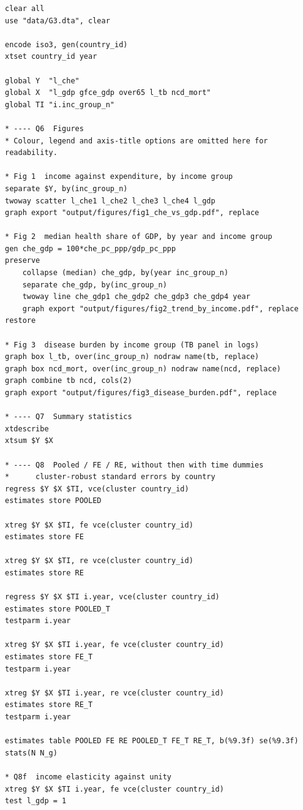 \documentclass[11pt,a4paper]{article}
\begin{document}
\begin{footnotesize}
\begin{verbatim}
clear all
use "data/G3.dta", clear

encode iso3, gen(country_id)
xtset country_id year

global Y  "l_che"
global X  "l_gdp gfce_gdp over65 l_tb ncd_mort"
global TI "i.inc_group_n"

* ---- Q6  Figures
* Colour, legend and axis-title options are omitted here for readability.

* Fig 1  income against expenditure, by income group
separate $Y, by(inc_group_n)
twoway scatter l_che1 l_che2 l_che3 l_che4 l_gdp
graph export "output/figures/fig1_che_vs_gdp.pdf", replace

* Fig 2  median health share of GDP, by year and income group
gen che_gdp = 100*che_pc_ppp/gdp_pc_ppp
preserve
    collapse (median) che_gdp, by(year inc_group_n)
    separate che_gdp, by(inc_group_n)
    twoway line che_gdp1 che_gdp2 che_gdp3 che_gdp4 year
    graph export "output/figures/fig2_trend_by_income.pdf", replace
restore

* Fig 3  disease burden by income group (TB panel in logs)
graph box l_tb, over(inc_group_n) nodraw name(tb, replace)
graph box ncd_mort, over(inc_group_n) nodraw name(ncd, replace)
graph combine tb ncd, cols(2)
graph export "output/figures/fig3_disease_burden.pdf", replace

* ---- Q7  Summary statistics
xtdescribe
xtsum $Y $X

* ---- Q8  Pooled / FE / RE, without then with time dummies
*      cluster-robust standard errors by country
regress $Y $X $TI, vce(cluster country_id)
estimates store POOLED

xtreg $Y $X $TI, fe vce(cluster country_id)
estimates store FE

xtreg $Y $X $TI, re vce(cluster country_id)
estimates store RE

regress $Y $X $TI i.year, vce(cluster country_id)
estimates store POOLED_T
testparm i.year

xtreg $Y $X $TI i.year, fe vce(cluster country_id)
estimates store FE_T
testparm i.year

xtreg $Y $X $TI i.year, re vce(cluster country_id)
estimates store RE_T
testparm i.year

estimates table POOLED FE RE POOLED_T FE_T RE_T, b(%9.3f) se(%9.3f) stats(N N_g)

* Q8f  income elasticity against unity
xtreg $Y $X $TI i.year, fe vce(cluster country_id)
test l_gdp = 1


\end{verbatim}
\end{footnotesize}
\end{document}
